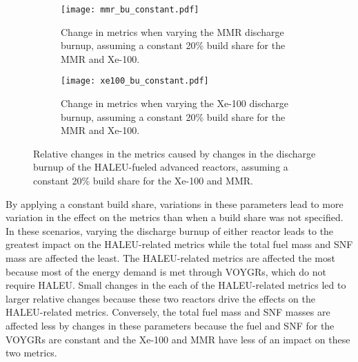 \begin{figure}
    \centering
    \begin{subfigure}{0.48\textwidth}
        \centering
        \texttt{[image: mmr\_bu\_constant.pdf]}
        \caption{Change in metrics when varying the MMR discharge burnup, 
        assuming a constant 20\% build share for the MMR and Xe-100.}
        \label{fig:mmr_bu_constant}
    \end{subfigure}
    \hfill
    \begin{subfigure}{0.48\textwidth}
        \centering
        \texttt{[image: xe100\_bu\_constant.pdf]}
        \caption{Change in metrics when varying the Xe-100 discharge burnup, 
        assuming a constant 20\% build share for the MMR and Xe-100.}
        \label{fig:xe100_bu_constant}
    \end{subfigure}
    \caption{Relative changes in the metrics caused by changes in the discharge 
    burnup of the HALEU-fueled advanced reactors, assuming a constant 
    20\% build share for the Xe-100 and MMR.}
    \label{fig:bu_constant}
\end{figure}

By applying a constant build share, variations in these parameters lead to 
more variation in the effect on the metrics than when a build share was not 
specified. In these scenarios, varying the discharge burnup of either reactor 
leads to the greatest impact on the \gls{HALEU}-related metrics while the  
total fuel mass and \gls{SNF} mass are affected the least. 
The \gls{HALEU}-related metrics are affected the most because most of the 
energy demand is met through VOYGRs, which do not require \gls{HALEU}. 
Small changes in the each of the \gls{HALEU}-related metrics led to larger 
relative changes because these two reactors drive the effects on the 
\gls{HALEU}-related metrics. Conversely, the total fuel mass and \gls{SNF} 
masses are affected less by changes in these parameters because the fuel 
and \gls{SNF} for the VOYGRs are constant and the Xe-100 and \gls{MMR} 
have less of an impact on these two metrics. 
